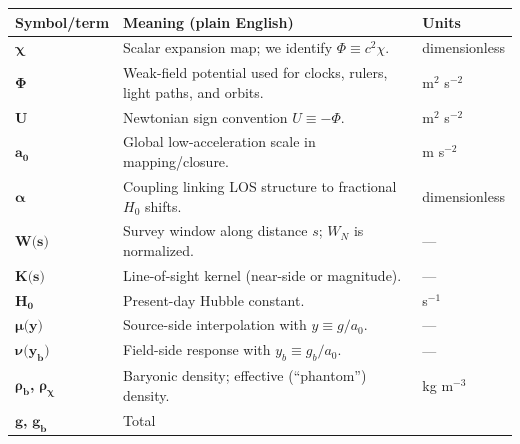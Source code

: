 \documentclass[
]{article}
\begin{document}
\begin{longtable}[]{@{}
  >{\centering\arraybackslash}p{}
  >{\raggedright\arraybackslash}p{}
  >{\raggedright\arraybackslash}p{}@{}}
\toprule\noalign{}
\begin{minipage}[b]{\linewidth}\centering
\textbf{Symbol/term}
\end{minipage} & \begin{minipage}[b]{\linewidth}\raggedright
\textbf{Meaning (plain English)}
\end{minipage} & \begin{minipage}[b]{\linewidth}\raggedright
\textbf{Units}
\end{minipage} \\
\midrule\noalign{}
\endhead
\bottomrule\noalign{}
\endlastfoot
\(\mathbf{\chi}\) & Scalar expansion map; we identify
\(\Phi \equiv c^{2}\chi\). & dimensionless \\
\(\mathbf{\Phi}\) & Weak-field potential used for clocks, rulers, light
paths, and orbits. & m\(^{2}\) s\(^{- 2}\) \\
\(\mathbf{U}\) & Newtonian sign convention \(U \equiv - \Phi\). &
m\(^{2}\) s\(^{- 2}\) \\
\(\mathbf{a}_{\mathbf{0}}\) & Global low-acceleration scale in
mapping/closure. & m s\(^{- 2}\) \\
\(\mathbf{\alpha}\) & Coupling linking LOS structure to fractional
\(H_{0}\) shifts. & dimensionless \\
\(\mathbf{W}\mathbf{(}\mathbf{s}\mathbf{)}\) & Survey window along
distance \(s\); \(W_{N}\) is normalized. & --- \\
\(\mathbf{K}\mathbf{(}\mathbf{s}\mathbf{)}\) & Line-of-sight kernel
(near-side or magnitude). & --- \\
\(\mathbf{H}_{\mathbf{0}}\) & Present-day Hubble constant. &
s\(^{- 1}\) \\
\(\mathbf{\mu}\mathbf{(}\mathbf{y}\mathbf{)}\) & Source-side
interpolation with \(y \equiv g/a_{0}\). & --- \\
\(\mathbf{\nu}\mathbf{(}\mathbf{y}_{\mathbf{b}}\mathbf{)}\) & Field-side
response with \(y_{b} \equiv g_{b}/a_{0}\). & --- \\
\(\mathbf{\rho}_{\mathbf{b}}\)\textbf{,}
\(\mathbf{\rho}_{\mathbf{\chi}}\) & Baryonic density; effective
(``phantom'') density. & kg m\(^{- 3}\) \\
\(\mathbf{g}\)\textbf{,} \(\mathbf{g}_{\mathbf{b}}\) & Total

\end{longtable}
\end{document}
